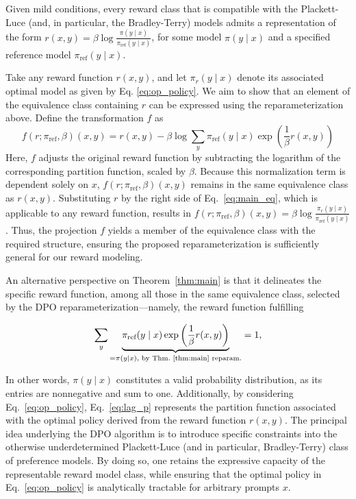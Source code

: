 \begin{theorem}\label{thm:main}
    Given mild conditions, every reward class that is compatible with the Plackett-Luce (and, in particular, the Bradley-Terry) models admits a representation of the form ${r(x, y) = \beta \log \frac{\pi(y\mid x)}{\pi_\text{ref}(y\mid x)}}$, for some model $\pi(y\mid x)$ and a specified reference model $\pi_\text{ref}(y \mid x)$.
\end{theorem}

\begin{sproof}
    Take any reward function $r(x, y)$, and let $\pi_r(y \mid x)$ denote its associated optimal model as given by Eq. \ref{eq:op_policy}. We aim to show that an element of the equivalence class containing $r$ can be expressed using the reparameterization above. Define the transformation $f$ as
\begin{equation}
    f(r; \pi_\text{ref}, \beta)(x, y) = r(x, y) - \beta\log\sum_{y}\pi_\text{ref}(y\mid x)\exp\left(\frac{1}{\beta}r(x, y)\right)
\end{equation}
Here, $f$ adjusts the original reward function by subtracting the logarithm of the corresponding partition function, scaled by $\beta$. Because this normalization term is dependent solely on $x$, $f(r; \pi_\text{ref}, \beta)(x, y)$ remains in the same equivalence class as $r(x, y)$. Substituting $r$ by the right side of Eq.~\ref{eq:main_eq}, which is applicable to any reward function, results in $f(r; \pi_\text{ref}, \beta)(x, y) = \beta \log \frac{\pi_r(y\mid x)}{\pi_\text{ref}(y\mid x)}$. Thus, the projection $f$ yields a member of the equivalence class with the required structure, ensuring the proposed reparameterization is sufficiently general for our reward modeling.
\end{sproof}

An alternative perspective on Theorem~\ref{thm:main} is that it delineates the specific reward function, among all those in the same equivalence class, selected by the DPO reparameterization—namely, the reward function fulfilling

\begin{equation}\label{eq:lag_p}
     \sum_{y}\underbrace{\pi_\text{ref}(y\mid x)\exp\left(\frac{1}{\beta}r(x, y)\right)}_{=\pi(y\mid x)\text{, by Thm.~\ref{thm:main} reparam.}} = 1,
\end{equation}

In other words, $\pi(y\mid x)$ constitutes a valid probability distribution, as its entries are nonnegative and sum to one. Additionally, by considering Eq.~\ref{eq:op_policy}, Eq.~\ref{eq:lag_p} represents the partition function associated with the optimal policy derived from the reward function $r(x, y)$. The principal idea underlying the DPO algorithm is to introduce specific constraints into the otherwise underdetermined Plackett-Luce (and in particular, Bradley-Terry) class of preference models. By doing so, one retains the expressive capacity of the representable reward model class, while ensuring that the optimal policy in Eq.~\ref{eq:op_policy} is analytically tractable for arbitrary prompts $x$.

